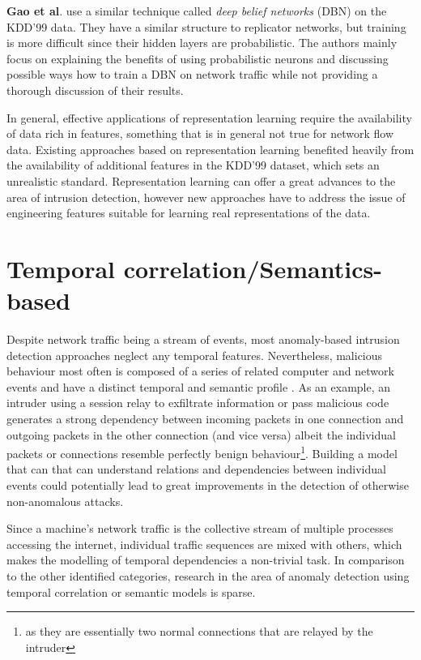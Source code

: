 \documentclass[a4paper,12pt,twoside]{report}
\begin{document}
\textbf{Gao et al}. \cite{gao_intrusion_2014} use a similar technique called \textit{deep belief networks} (DBN) on the KDD'99 data. They have a similar structure to replicator networks, but training is more difficult since their hidden layers are probabilistic. The authors mainly focus on explaining the benefits of using probabilistic neurons and discussing possible ways how to train a DBN on network traffic while not providing a thorough discussion of their results.

In general, effective applications of representation learning require the availability of data rich in features, something that is in general not true for network flow data. Existing approaches based on representation learning benefited heavily from the availability of additional features in the KDD'99 dataset, which sets an unrealistic standard. Representation learning can offer a great advances to the area of intrusion detection, however new approaches have to address the issue of engineering features suitable for learning real representations of the data.





\section{Temporal correlation/Semantics-based}

Despite network traffic being a stream of events, most anomaly-based intrusion detection approaches neglect any temporal features. Nevertheless, malicious behaviour most often is composed of  a series  of related computer and network  events and have a distinct temporal and semantic profile \cite{ye2000markov}. As an example, an intruder using a session relay to exfiltrate information or pass malicious code generates a strong dependency between incoming packets in one connection and outgoing packets in the other connection (and vice versa) albeit the individual packets or connections resemble perfectly benign behaviour\footnote{as they are essentially two normal connections that are relayed by the intruder}. Building a model that can that can understand relations and dependencies between individual events could potentially lead to great improvements in the detection of otherwise non-anomalous attacks. 

Since a machine's network traffic is the collective stream of multiple processes accessing the internet, individual traffic sequences are mixed with others, which makes the modelling of temporal dependencies a non-trivial task. In comparison to the other identified categories, research in the area of anomaly detection using temporal correlation or semantic models is sparse. 
\end{document}

